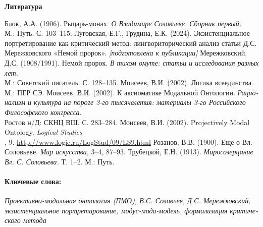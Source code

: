 \begin{russian}
    {\centering \textbf{Литература} \par}
    Блок, А.А. (1906). Рыцарь-монах. \textit{О Владимире Соловьеве. Сборник первый.}\\\textbf{ }М.: Путь. С. 103–115.
    Луговская, Е.Г., Грудина, Е.К. (2024). Экзистенциальное портретирование как критический метод: лингвориторический анализ статьи Д.С. Мережковского «Немой пророк». \textit{[подготовлена к публикации]}
    Мережковский, Д.С. (1908/1991). Немой пророк. \textit{В тихом омуте: статьи и исследования разных лет.}\\\textbf{ }М.: Советский писатель. С. 128–135.
    Моисеев, В.И. (2002). Логика всеединства. М.: ПЕР СЭ.
    Моисеев, В.И. (2002). К аксиоматике Модальной Онтологии. \textit{Рационализм и культура на пороге 3-го тысячелетия: материалы 3-го Российского Философского конгресса.}\\\textbf{ }Ростов н/Д: СКНЦ ВШ. С. 283–284.
    Моисеев, В.И. (2002). Projectively Modal Ontology. \textit{Logical Studies}\\, 9. \underline{\href{http://www.logic.ru/LogStud/09/LS9.html}{http://www.logic.ru/LogStud/09/LS9.html}}
    Розанов, В.В. (1900). Еще о Вл. Соловьеве. \textit{Мир искусства}, 3–4, 87–93.
    Трубецкой, Е.Н. (1913). \textit{Миросозерцание Вл. С. Соловьева.} Т. 1–2. М.: Путь.

    \paragraph{Ключевые слова:} {\itshape Проективно-модальная онтология (ПМО), В.С. Соловьев, Д.С. Мережковский, экзистенциальное портретирование, модус-мода-модель, формализация критического метода}
    \end{russian}
\fi
